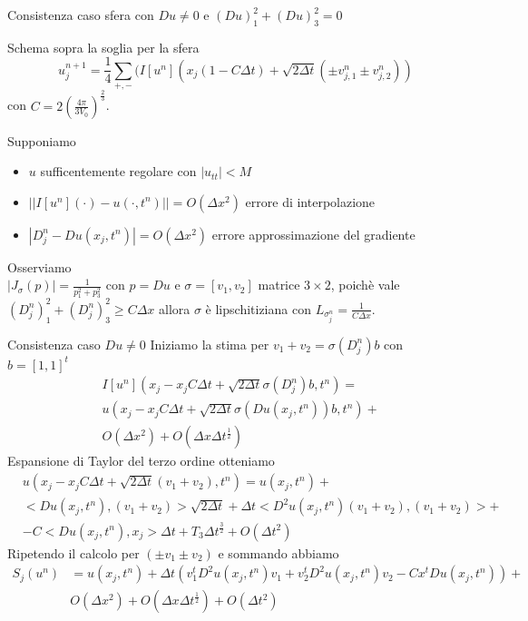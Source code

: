 \begin{frame}{Consistenza caso sfera con $Du\neq 0$ e $(Du)_1^2+(Du)_3^2=0$}
  \begin{alertblock}{Schema sopra la soglia per la sfera}
   \[
     u_j^{n+1}=\frac{1}{4}\sum_{+,-}(I[u^n](x_j(1-C\Delta
     t)+\sqrt{2\Delta t}(\pm v_{j,1}^n\pm v_{j,2}^n))
    \]
    con $C=2\left(\frac{4\pi}{3V_0}\right)^\frac{2}{3}$.
  \end{alertblock}
  Supponiamo
  \begin{itemize}
    \item $u$ sufficentemente regolare con $|u_{tt}|<M$
    \item $||I[u^n](\cdot)-u(\cdot,t^n)||=O(\Delta x^2)$ errore di
      interpolazione 
    \item $|D_j^n-Du(x_j,t^n)|=O(\Delta x^2)$ errore approssimazione
      del gradiente
   \end{itemize}
  Osserviamo \\ 
      $|J_{\sigma}(p)|=\frac{1}{p_1^2+p_3^2}$ con $p=Du$ e
      $\sigma=[v_1,v_2]$ matrice $3\times 2$,  poichè vale
      $(D_j^n)_1^2+(D_j^n)_3^2\geq C\Delta x$ allora $\sigma$ è
      lipschitiziana con $L_{\sigma_j^n}=\frac{1}{C\Delta x}$.  
 \end{frame}

\begin{frame}{Consistenza caso $Du\neq 0$}
Iniziamo la stima per \alert{$v_1+v_2=\sigma(D_j^n)b$} con $b=[1,1]^t$
\[
\begin{aligned}
  &I[u^n](x_j-x_jC\Delta t +\sqrt{2\Delta t}\sigma(D_j^n)b,t^n)=\\
  &u(x_j-x_jC\Delta t +\sqrt{2\Delta t}\sigma(Du(x_j,t^n))b,t^n)+\\
  &O(\Delta x^2) + O(\Delta x\Delta t^{\frac{1}{2}}) 
\end{aligned}
\]
Espansione di Taylor del terzo ordine otteniamo
\[
\begin{aligned}
&u(x_j-x_jC\Delta t +\sqrt{2\Delta
    t}(v_1+v_2),t^n)=u(x_j,t^n)+\\
&<Du(x_j,t^n),(v_1+v_2)>\sqrt{2\Delta t}+\Delta
  t<D^2u(x_j,t^n)(v_1+v_2),(v_1+v_2)>+\\
&-C<Du(x_j,t^n),x_j>\Delta t+T_3\Delta t^{\frac{3}{2}} +O(\Delta t^2)
\end{aligned}
\]
Ripetendo il calcolo per $(\pm v_1\pm v_2)$ e sommando abbiamo
\[
\begin{aligned}
S_j(u^n)&=u(x_j,t^n)+\Delta t(v_1^tD^2u(x_j,t^n)v_1+v_2^tD^2u(x_j,t^n)v_2-Cx^tDu(x_j,t^n))+\\
&O(\Delta x^2)+ O(\Delta x\Delta t^{\frac{1}{2}})+ O(\Delta t^2)
\end{aligned}
\]
\end{frame}

